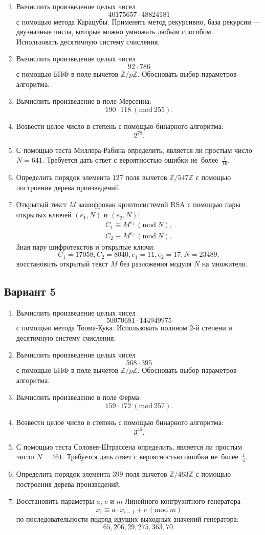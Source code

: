 \documentclass[14pt]{extarticle}
\begin{document}
	\begin{enumerate}
		\item Вычислить произведение целых чисел \[40175657 \cdot 48824181\] с помощью метода Карацубы. Применять метод рекурсивно, база рекурсии — двузначные числа, которые можно умножать любым способом.\\ Использовать десятичную систему счисления.
		\item Вычислить произведение целых чисел \[92 \cdot 786\] с помощью БПФ в поле вычетов $\mathbb{Z}/p\mathbb{Z}$. Обосновать выбор параметров алгоритма.
		\item Вычислить произведение в поле Мерсенна: \[190 \cdot 118\ (\textrm{mod}\ 255).\]
		\item Возвести целое число в степень с помощью бинарного алгоритма: \[2^{78}.\]
		\item С помощью теста Миллера-Рабина определить, является ли простым число $N = 641$. Требуется дать ответ с вероятностью ошибки не~более~$\frac{1}{16}$.
		\item Определить порядок элемента $127$ поля вычетов $\mathbb{Z}/547\mathbb{Z}$ с помощью построения дерева произведений.
		\item Открытый текст $M$ зашифрован криптосистемой RSA с помощью пары открытых ключей $(e_1, N)$ и $(e_2, N)$:  \[\begin{aligned} C_1 \equiv M^{e_1}\ (\textrm{mod}\ N), \\ C_2 \equiv M^{e_2}\ (\textrm{mod}\ N). \end{aligned}\] Зная пару шифротекстов и открытые ключи: \[C_1 = 17058, C_2 = 8040, e_1 = 11, e_2 = 17, N = 23489,\] восстановить открытый текст $M$ без разложения модуля $N$ на множители.
	\end{enumerate}
\clearpage	\subsection{Вариант 5}
	\begin{enumerate}
		\item Вычислить произведение целых чисел \[50070681 \cdot 144949975\] с помощью метода Тоома-Кука. Использовать полином 2-й степени и десятичную систему счисления.
		\item Вычислить произведение целых чисел \[568 \cdot 395\] с помощью БПФ в поле вычетов $\mathbb{Z}/p\mathbb{Z}$. Обосновать выбор параметров алгоритма.
		\item Вычислить произведение в поле Ферма: \[159 \cdot 172\ (\textrm{mod}\ 257).\]
		\item Возвести целое число в степень с помощью бинарного алгоритма: \[3^{45}.\]
		\item С помощью теста Соловея-Штрассена определить, является ли простым число $N = 461$. Требуется дать ответ с вероятностью ошибки не~более~$\frac14$.
		\item Определить порядок элемента $399$ поля вычетов $\mathbb{Z}/463\mathbb{Z}$ с помощью построения дерева произведений.
		\item Восстановить параметры $a$, $c$ и $m$ Линейного конгруэнтного генератора \[x_i \equiv a \cdot x_{i-1} + c\ (\textrm{mod}\ m)\] по последовательности подряд идущих выходных значений генератора: \[65, 206, 29, 275, 363, 70.\]
	\end{enumerate}
\clearpage
\end{document}
